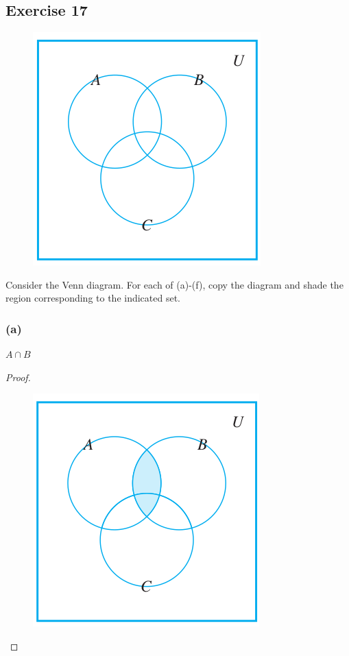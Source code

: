 \documentclass[14pt]{extarticle}
\begin{document}
\subsection{Exercise 17}
\begin{figure}[ht!]
\centering
\includegraphics[scale=0.3]{../images/6.1.17.png}
\end{figure}
Consider the Venn diagram. For each of (a)-(f), copy the diagram and shade the region corresponding to the indicated set.

\subsubsection{(a)}
$A \cap B$

\begin{proof}
\begin{figure}[ht!]
\centering
\includegraphics[scale=0.3]{../images/6.1.17.a.png}
\end{figure}
\end{proof}
\end{document}
